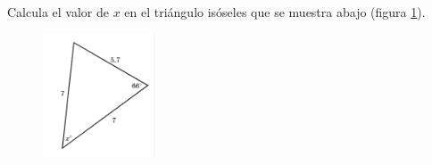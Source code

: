 Calcula el valor de $x$ en el triángulo isóseles  que se muestra abajo (figura \ref{fig:findangle03}).
\begin{figure}[H]
    \begin{center}
        \includegraphics[width=0.3\textwidth]{../images/findangle03.png}
    \end{center}
    \caption{}
    \label{fig:findangle03}
\end{figure}